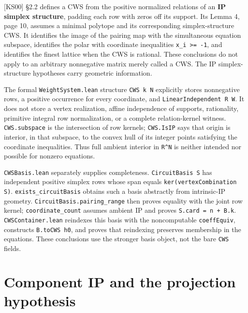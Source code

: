 \documentclass[11pt,a4paper,oneside]{report}
\begin{document}
{[}KS00{]} §2.2 defines a CWS from the positive normalized relations of
an \textbf{IP simplex structure}, padding each row with zeros off its
support. Its Lemma 4, page 10, assumes a minimal polytope and its
corresponding simplex-structure CWS. It identifies the image of the
pairing map with the simultaneous equation subspace, identifies the
polar with coordinate inequalities
\texttt{x\_\allowbreak{}i >=\allowbreak{} -\allowbreak{}1}, and
identifies the finest lattice when the CWS is rational. These
conclusions do not apply to an arbitrary nonnegative matrix merely
called a CWS. The IP simplex-structure hypotheses carry geometric
information.

The formal \texttt{WeightSy\allowbreak{}stem.\allowbreak{}lean}
structure \texttt{CWS k N} explicitly stores nonnegative rows, a
positive occurrence for every coordinate, and
\texttt{LinearIn\allowbreak{}dependen\allowbreak{}t R W}. It does not
store a vertex realization, affine independence of supports,
rationality, primitive integral row normalization, or a complete
relation-kernel witness. \texttt{CWS.\allowbreak{}subspace} is the
intersection of row kernels; \texttt{CWS.\allowbreak{}IsIP} says that
origin is interior, in that subspace, to the convex hull of its integer
points satisfying the coordinate inequalities. Thus full ambient
interior in \texttt{R\textasciicircum{}N} is neither intended nor
possible for nonzero equations.

\texttt{CWSBasis\allowbreak{}.\allowbreak{}lean} separately supplies
completeness. \texttt{CircuitB\allowbreak{}asis S} has independent
positive simplex rows whose span equals
\texttt{ker(\allowbreak{}vertexCo\allowbreak{}mbinatio\allowbreak{}n S)}.
\texttt{exists\_\allowbreak{}circuitB\allowbreak{}asis} obtains such a
basis abstractly from intrinsic-IP geometry.
\texttt{CircuitB\allowbreak{}asis.\allowbreak{}pairing\_\allowbreak{}range}
then proves equality with the joint row kernel;
\texttt{coordina\allowbreak{}te\_\allowbreak{}count} assumes ambient IP
and proves
\texttt{S.\allowbreak{}card =\allowbreak{} n + B.\allowbreak{}k}.
\texttt{CWSConta\allowbreak{}iner.\allowbreak{}lean} reindexes this
basis with the noncomputable \texttt{coeffEqu\allowbreak{}iv},
constructs \texttt{B.\allowbreak{}toCWS h0}, and proves that reindexing
preserves membership in the equations. These conclusions use the
stronger basis object, not the bare \texttt{CWS} fields.

\section{Component IP and the projection
hypothesis}\label{cws-and-lattice-realizations--component-ip-and-the-projection-hypothesis}
\end{document}
